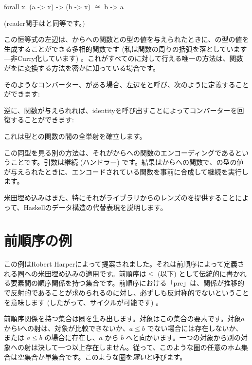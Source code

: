 \begin{snipv}
forall x. (a -> x) -> (b -> x) \ensuremath{\cong} b -> a
\end{snipv}
 (reader関手はと同等です。) 

この恒等式の左辺は、からへの関数との型の値を与えられたときに、の型の値を生成することができる多相的関数です (私は関数の周りの括弧を落としています---非Curry化しています) 。これがすべてのに対して行える唯一の方法は、関数がをに変換する方法を密かに知っている場合です。

そのようなコンバーター、がある場合、左辺をと呼び、次のように定義することができます: 

逆に、関数が与えられれば、identityを呼び出すことによってコンバーターを回復することができます: 

これは型との関数の間の全単射を確立します。

この同型を見る別の方法は、それがからへの関数のエンコーディングであるということです。引数は継続 (ハンドラー) です。結果はからへの関数で、の型の値が与えられたときに、エンコードされている関数を事前に合成して継続を実行します。

米田埋め込みはまた、特にそれがライブラリからのレンズのを提供することによって、Haskellのデータ構造の代替表現を説明します。

\section{前順序の例}

この例はRobert Harperによって提案されました。それは前順序によって定義される圏への米田埋め込みの適用です。前順序は$\leqslant$ (以下) として伝統的に書かれる要素間の順序関係を持つ集合です。前順序における「pre」は、関係が推移的で反射的であることが求められるのに対し、必ずしも反対称的でないということを意味します (したがって、サイクルが可能です) 。

前順序関係を持つ集合は圏を生み出します。対象はこの集合の要素です。対象$a$から$b$への射は、対象が比較できないか、$a \leqslant b$ でない場合には存在しないか、または $a \leqslant b$ の場合に存在し、$a$ から $b$ へと向かいます。一つの対象から別の対象への射は決して一つ以上存在しません。従って、このような圏の任意のホム集合は空集合か単集合です。このような圏を\emph{薄い}と呼びます。

